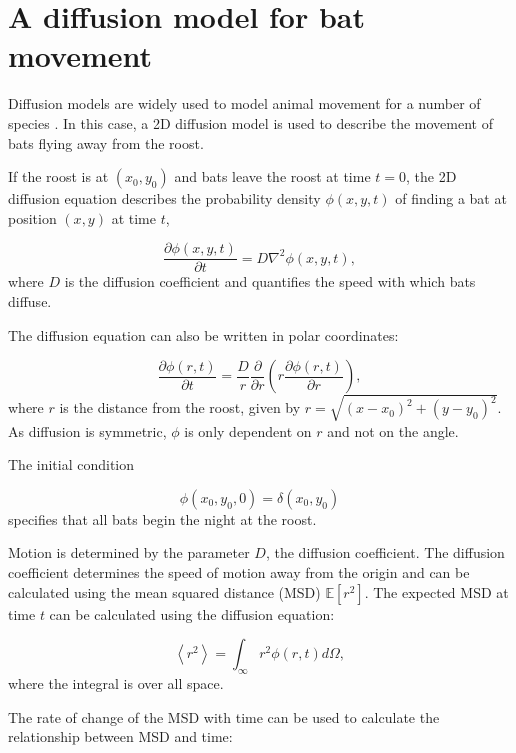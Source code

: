 \documentclass{article}
\newcommand{\D}[2]{\frac{\partial #1}{\partial #2}}
\begin{document}
\section{A diffusion model for bat movement}

Diffusion models are widely used to model animal movement for a number of species \cite{Ovaskainen2016}. In this case, a 2D diffusion model is used to describe the movement of bats flying away from the roost.

If the roost is at $(x_0,y_0)$ and bats leave the roost at time $t =0$,
the 2D diffusion equation describes the probability density $\phi(x,y,t)$ of
finding a bat at position $(x,y)$ at time $t$,

\begin{equation}
  \D{\phi(x,y,t)}{ t} = D \nabla^2 \phi(x,y,t) ,
  \nonumber
\end{equation}
%
where $D$ is the diffusion coefficient and quantifies the speed with which bats diffuse.

The diffusion equation can also be written in polar coordinates:

\begin{equation}
\D{ \phi(r,t)}{t} = \frac{D}{r} \D{}{ r} \left( r \D{\phi(r,t)}{r} \right),
\end{equation}
%
where $r$ is the distance from the roost, given by $r=\sqrt{(x-x_0)^2 + (y-y_0)^2}$. As diffusion is symmetric, $\phi$ is only dependent on $r$ and not on the angle.

The initial condition

\begin{equation}
\phi(x_0,y_0,0) = \delta(x_0,y_0)
\label{eqn:IC}
\end{equation}
%
specifies that all bats begin the night at the roost.

Motion is determined by the parameter $D$, the diffusion coefficient. The diffusion coefficient determines the speed of motion away from the origin and can be calculated using the mean squared distance (MSD) $\mathbb{E}[r^2]$. The expected MSD at time $t$ can be calculated using the diffusion equation:

\begin{equation}
\left<r^2\right> = \int_{\infty}r^2 \phi(r,t) d\Omega ,
\end{equation}
%
where the integral is over all space.

The rate of change of the MSD with time can be used to calculate the relationship between MSD and time:
\end{document}
